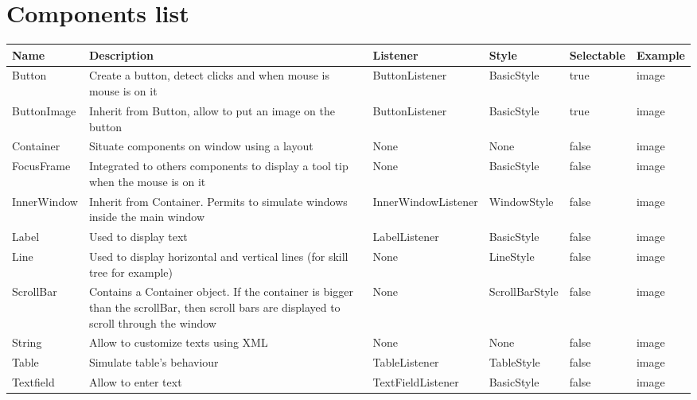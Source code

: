 \documentclass{scrreprt}
\begin{document}
					\chapter{Components list}
					\addtolength{\oddsidemargin}{-.875in}
					\addtolength{\evensidemargin}{-.875in}
					\small
\begin{center}
\begin{tabular}{|p{2.2cm}|p{4cm}|p{3.5cm}|p{2cm}|p{2cm}|p{2cm}|}
\hline
Name & Description & Listener & Style & Selectable & Example \\
\hline
Button & Create a button, detect clicks and when mouse is mouse is on it & ButtonListener & BasicStyle & true & image \\
\hline
ButtonImage & Inherit from Button, allow to put an image on the button & ButtonListener & BasicStyle & true & image \\
\hline
Container & Situate components on window using a layout & None & None & false & image \\
\hline
FocusFrame & Integrated to others components to display a tool tip when the mouse is on it & None & BasicStyle & false & image \\
\hline
InnerWindow & Inherit from Container. Permits to simulate windows inside the main window & InnerWindowListener & WindowStyle & false & image \\
\hline
Label & Used to display text & LabelListener & BasicStyle & false & image \\
\hline
Line & Used to display horizontal and vertical lines (for skill tree for example) & None & LineStyle & false & image \\
\hline
ScrollBar & Contains a Container object. If the container is bigger than the scrollBar, then scroll bars are displayed to scroll through the window & None & ScrollBarStyle & false & image \\
\hline
String & Allow to customize texts using XML & None & None & false & image \\
\hline
Table & Simulate table's behaviour & TableListener & TableStyle & false & image \\
\hline
Textfield & Allow to enter text & TextFieldListener & BasicStyle & false & image \\
\hline
\end{tabular}
\end{center}
\end{document}
